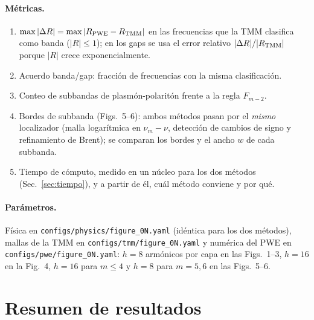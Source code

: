\documentclass[11pt,a4paper]{article}
\newcommand{\code}[1]{\texttt{#1}}
\begin{document}
\paragraph{Métricas.}
\begin{enumerate}[label=(\alph*)]
\item $\max|\Delta R|=\max|R_{\rm PWE}-R_{\rm TMM}|$ en las frecuencias que la
TMM clasifica como banda ($|R|\le1$); en los gaps se usa el error relativo
$|\Delta R|/|R_{\rm TMM}|$ porque $|R|$ crece exponencialmente.
\item Acuerdo banda/gap: fracción de frecuencias con la misma clasificación.
\item Conteo de subbandas de plasmón-polaritón frente a la regla $F_{m-2}$.
\item Bordes de subbanda (Figs.~5--6): ambos métodos pasan por el \emph{mismo}
localizador (malla logarítmica en $\nu_m-\nu$, detección de cambios de signo y
refinamiento de Brent); se comparan los bordes y el ancho $w$ de cada subbanda.
\item Tiempo de cómputo, medido en un núcleo para los dos métodos
(Sec.~\ref{sec:tiempo}), y a partir de él, cuál método conviene y por qué.
\end{enumerate}

\paragraph{Parámetros.} Física en \code{configs/physics/figure\_0N.yaml}
(idéntica para los dos métodos), mallas de la TMM en
\code{configs/tmm/figure\_0N.yaml} y numérica del PWE en
\code{configs/pwe/figure\_0N.yaml}:
$h=8$ armónicos por capa en las Figs.~1--3, $h=16$ en la Fig.~4, $h=16$ para
$m\le4$ y $h=8$ para $m=5,6$ en las Figs.~5--6.

\section{Resumen de resultados}
\end{document}
